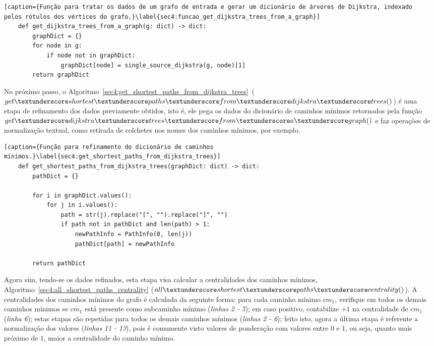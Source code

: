 \begin{lstlisting}[caption={Função para tratar os dados de um grafo de entrada e gerar um dicionário de árvores de Dijkstra, indexado pelos rótulos dos vértices do grafo.}\label{sec4:funcao_get_dijkstra_trees_from_a_graph}]
	def get_dijkstra_trees_from_a_graph(g: dict) -> dict:
		graphDict = {}
		for node in g:
			if node not in graphDict:
				graphDict[node] = single_source_dijkstra(g, node)[1]
		return graphDict
\end{lstlisting}

No próximo passo, o Algoritmo~\ref{sec4:get_shortest_paths_from_dijkstra_trees}~(\emph{$get\textunderscore shortest\textunderscore paths\textunderscore from\textunderscore dijkstra\textunderscore trees()$}) é uma etapa de refinamento dos dados previamente obtidos, isto é, ele pega os dados do dicionário de caminhos mínimos retornados pela função \emph{$get\textunderscore dijkstra\textunderscore trees\textunderscore from\textunderscore a\textunderscore graph()$} e faz operações de normalização textual, como retirada de colchetes nos nomes dos caminhos mínimos, por exemplo.

\begin{lstlisting}[caption={Função para refinamento do dicionário de caminhos mínimos.}\label{sec4:get_shortest_paths_from_dijkstra_trees}]
	def get_shortest_paths_from_dijkstra_trees(graphDict: dict) -> dict:
		pathDict = {}

		for i in graphDict.values():
			for j in i.values():
				path = str(j).replace("[", "").replace("]", "")
				if path not in pathDict and len(path) > 1:
					newPathInfo = PathInfo(0, len(j))
					pathDict[path] = newPathInfo

		return pathDict
\end{lstlisting}

Agora sim, tendo-se os dados refinados, esta etapa visa calcular a centralidades dos caminhos mínimos, Algoritmo~\ref{sec4:all_shortest_paths_centrality} (\emph{$all\textunderscore shortest\textunderscore paths\textunderscore centrality()$}). A centralidades dos caminhos mínimos do grafo é calculada da seguinte forma: para cada caminho mínimo $cm_1$, verifique em todos os demais caminhos mínimos se $cm_1$ está presente como subcaminho mínimo (\emph{linhas 2 - 5}); em caso positivo, contabilize $+1$ na centralidade de $cm_1$ (\emph{linha 6}); estas etapas são repetidas para todos os demais caminhos mínimos (\emph{linhas 2 - 6}); feito isto, agora a última etapa é referente a normalização dos valores (\emph{linhas 11 - 13}), pois é comumente visto valores de ponderação com valores entre $0$ e $1$, ou seja, quanto mais próximo de $1$, maior a centralidade do caminho mínimo.

